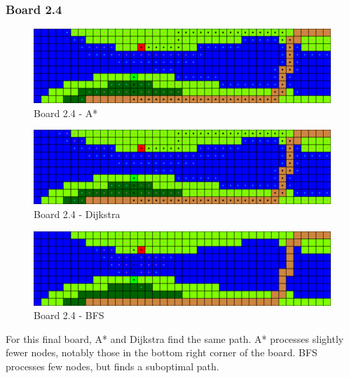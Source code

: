 \clearpage

\subsubsection*{Board 2.4}

\begin{figure}[h!]
  \centering
    \includegraphics[width=\textwidth]{img/board-2-4-astar}
    \caption{Board 2.4 - A*}
\end{figure}

\begin{figure}[h!]
  \centering
    \includegraphics[width=\textwidth]{img/board-2-4-dijkstra}
    \caption{Board 2.4 - Dijkstra}
\end{figure}

\begin{figure}[h!]
  \centering
    \includegraphics[width=\textwidth]{img/board-2-4-bfs}
    \caption{Board 2.4 - BFS}
\end{figure}

For this final board, A* and Dijkstra find the same path. A* processes slightly
fewer nodes, notably those in the bottom right corner of the board.
BFS processes few nodes, but finds a suboptimal path.
